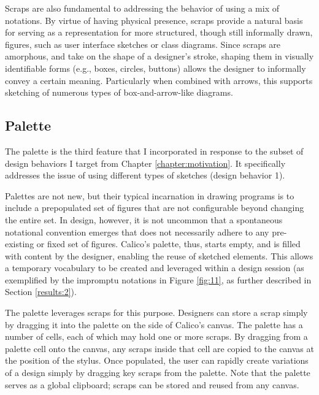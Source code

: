 Scraps are also fundamental to addressing the behavior of using a mix of notations. By virtue of having physical presence, scraps provide a natural basis for serving as a representation for more structured, though still informally drawn, figures, such as user interface sketches or class diagrams. Since scraps are amorphous, and take on the shape of a designer's stroke, shaping them in visually identifiable forms (e.g., boxes, circles, buttons) allows the designer to informally convey a certain meaning. Particularly when combined with arrows, this supports sketching of numerous types of box-and-arrow-like diagrams. 

\subsection {Palette}
\label{calico:4}

The palette is the third feature that I incorporated in response to the subset of design behaviors I target from Chapter \ref{chapter:motivation}. It specifically addresses the issue of using different types of sketches (design behavior 1).

Palettes are not new, but their typical incarnation in drawing programs is to include a prepopulated set of figures that are not configurable beyond changing the entire set. In design, however, it is not uncommon that a spontaneous notational convention emerges that does not necessarily adhere to any pre-existing or fixed set of figures. Calico's palette, thus, starts empty, and is filled with content by the designer, enabling the reuse of sketched elements. This allows a temporary vocabulary to be created and leveraged within a design session (as exemplified by the impromptu notations in Figure \ref{fig:11}, as further described in Section \ref{results:2}). 

 
%

The palette leverages scraps for this purpose. Designers can store a scrap simply by dragging it into the palette on the side of Calico's canvas. The palette has a number of cells, each of which may hold one or more scraps. By dragging from a palette cell onto the canvas, any scraps inside that cell are copied to the canvas at the position of the stylus. Once populated, the user can rapidly create variations of a design simply by dragging key scraps from the palette.
Note that the palette serves as a global clipboard; scraps can be stored and reused from any canvas. 

